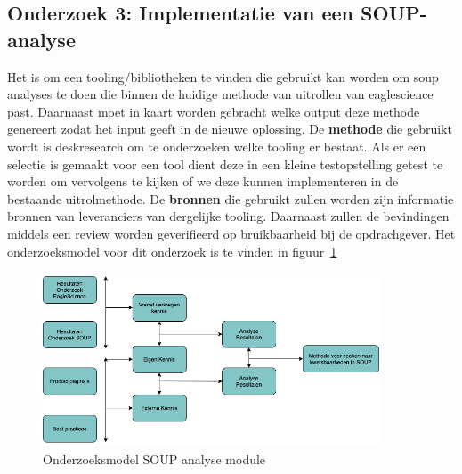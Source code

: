 %
%
%
%

\newpage %
\subsection{Onderzoek 3: Implementatie van een SOUP-analyse}\label{sec:onderzoek-naar-soup-analyse}
Het  is om een tooling/bibliotheken te vinden die gebruikt kan worden om soup analyses te doen die binnen de huidige methode van uitrollen van eaglescience past. Daarnaast moet in kaart worden gebracht welke output deze methode genereert zodat het input geeft in de nieuwe oplossing. De \textbf{methode} die gebruikt wordt is deskresearch om te onderzoeken welke tooling er bestaat. Als er een selectie is gemaakt voor een tool dient deze in een kleine testopstelling getest te worden om vervolgens te kijken of we deze kunnen implementeren in de bestaande uitrolmethode. De \textbf{bronnen} die gebruikt zullen worden zijn informatie bronnen van leveranciers van dergelijke tooling. Daarnaast zullen de bevindingen middels een review worden geverifieerd op bruikbaarheid bij de opdrachgever. Het onderzoeksmodel voor dit onderzoek is te vinden in figuur~\ref{fig:OnderzoeksModelSOUPmethode}

\begin{figure}[htbp] %
    \myfloatalign
    \includegraphics[width=10cm]{gfx/OnderzoeksModelSOUPMethode}
    \caption{Onderzoeksmodel SOUP analyse module}
    \label{fig:OnderzoeksModelSOUPmethode}
\end{figure}
